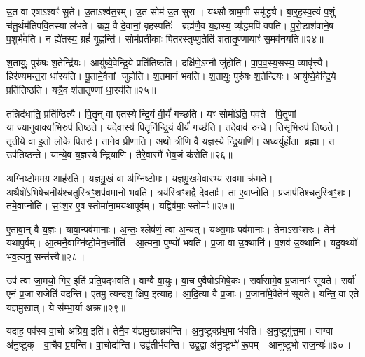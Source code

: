 उ॒त वा ए॒षा\-ऽश्वꣳ॑ सू॒ते।
उ॒ताऽश्व॑त॒रम्।
उ॒त सोम॑ उ॒त सुरा।
यथ्सौत्राम॒णी समृ॑द्ध्यै।
बा॒र्॒ह॒स्प॒त्यं प॒शुं च॑तु॒र्थम॑तिपवि॒तस्या ल॑भते।
ब्रह्म॒ वै दे॒वानां॒ बृह॒स्पतिः॑।
ब्रह्म॑णै॒व य॒ज्ञस्य॒ व्यृ॑द्ध॒मपि॑ वपति।
पु॒रो॒डाश॑वाने॒ष प॒शुर्भ॑वति।
न ह्ये॑तस्य॒ ग्रहं॑ गृ॒ह्णन्ति॑।
सोम॑प्रतीकाः पितरस्तृप्णु॒तेति॑ शतातृ॒ण्णायाꣳ॑ स॒मव॑नयति॥२४॥

श॒तायुः॒ पुरु॑षः श॒तेन्द्रि॑यः।
आयु॑ष्ये॒वेन्द्रि॒ये प्रति॑तिष्ठति।
दक्षि॑णे॒\-ऽग्नौ जु॑होति।
पा॒प॒व॒स्य॒सस्य॒ व्यावृ॑त्त्यै।
हिर॑ण्यमन्त॒रा धा॑रयति।
पू॒तामे॒वैनां जुहोति।
श॒तमा॑नं भवति।
श॒तायुः॒ पुरु॑षः श॒तेन्द्रि॑यः।
आयु॑ष्ये॒वेन्द्रि॒ये प्रति॑तिष्ठति।
यत्रै॒व श॑तातृ॒ण्णां धा॒रय॑ति॥२५॥

तन्निद॑धाति॒ प्रति॑ष्ठित्यै।
पि॒तॄन् वा ए॒तस्येन्द्रि॒यं वी॒र्यं॑ गच्छति।
यꣳ सोमो॑ऽति॒ पव॑ते।
पि॒तृ॒णां याज्यानुवा॒क्या॑भि॒रुप॑ तिष्ठते।
यदे॒वास्य॑ पि॒तॄनि॑न्द्रि॒यं वी॒र्यं॑ गच्छ॑ति।
तदे॒वाव॑ रुन्धे।
ति॒सृभि॒रुप॑ तिष्ठते।
तृ॒तीये॒ वा इ॒तो लो॒के पि॒तरः॑।
ताने॒व प्री॑णाति।
अथो॒ त्रीणि॒ वै य॒ज्ञस्येन्द्रि॒याणि॑।
अ॒ध्व॒र्युर्\mbox{}होता ब्र॒ह्मा।
त उप॑तिष्ठन्ते।
यान्ये॒व य॒ज्ञस्येन्द्रि॒याणि॑।
तैरे॒वास्मै॑ भेष॒जं क॑रोति॥२६॥\anuvakamend[प्री॒णा॒ति॒ प्र॒थ॒मो दक्षि॑णा स॒मव॑नयति धा॒रय॑तीन्द्रि॒याणि॑ च॒त्वारि॑ च]

अ॒ग्नि॒ष्टो॒ममग्र॒ आह॑रति।
य॒ज्ञ॒मु॒खं वा अ॑ग्निष्टो॒मः।
य॒ज्ञ॒मु॒खमे॒वारभ्य॑ स॒वमा क्र॑मते।
अथै॒षो॑\-ऽभिषेच॒नीय॑श्चतु\-स्त्रि॒ꣳ॒शप॑वमानो भवति।
त्रय॑स्त्रिꣳश॒द्वै दे॒वताः᳚।
ता ए॒वाप्नो॑ति।
प्र॒जाप॑तिश्चतुस्त्रि॒ꣳ॒शः।
तमे॒वाप्नो॑ति।
स॒ꣳ॒श॒र ए॒ष स्तोमा॑ना॒मय॑थापूर्वम्।
यद्विष॑माः॒ स्तोमाः᳚॥२७॥

ए॒तावा॒न् वै य॒ज्ञः।
यावा॒न्पव॑मानाः।
अ॒न्तः॒ श्लेष॑णं॒ त्वा अ॒न्यत्।
यथ्स॒माः पव॑मानाः।
तेनाऽसꣳ॑शरः।
तेन॑ यथापू॒र्वम्।
आ॒त्मनै॒वाग्नि॑ष्टो॒मेन॒र्ध्नोति॑।
आ॒त्मना॒ पुण्यो॑ भवति।
प्र॒जा वा उ॒क्थानि॑।
प॒शव॑ उ॒क्थानि॑।
यदु॒क्थ्यो॑ भव॒त्यनु॒ सन्त॑त्त्यै॥२८॥\anuvakamend[स्तोमा प॒शव॑ उ॒क्थान्येकं॑ च]

उप॑ त्वा जा॒मयो॒ गिर॒ इति॑ प्रति॒पद्भ॑वति।
वाग्वै वा॒युः।
वा॒च ए॒वैषो॑\-ऽभिषे॒कः।
सर्वा॑सामे॒व प्र॒जानाꣳ॑ सूयते।
सर्वा॑ एनं प्र॒जा राजेति॑ वदन्ति।
ए॒तमु॒ त्यन्दश॒ क्षिप॒ इत्या॑ह।
आ॒दि॒त्या वै प्र॒जाः।
प्र॒जाना॑मे॒वैतेन॑ सूयते।
यन्ति॒ वा ए॒ते य॑ज्ञमु॒खात्।
ये स॑म्भा॒र्या॑ अक्र\sn{}॥२९॥

यदाह॒ पव॑स्व वा॒चो अ॑ग्रिय॒ इति॑।
तेनै॒व य॑ज्ञमु॒खान्नय॑न्ति।
अ॒नु॒ष्टुक्प्र॑थ॒मा भ॑वति।
अ॒नु॒ष्टुगु॑त्त॒मा।
वाग्वा अ॑नु॒ष्टुक्।
वा॒चैव प्र॒यन्ति॑।
वा॒चोद्य॑न्ति।
उद्व॑तीर्भवन्ति।
उद्व॒द्वा अ॑नु॒ष्टुभो॑ रू॒पम्।
आनु॑ष्टुभो राज॒न्यः॑॥३०॥

